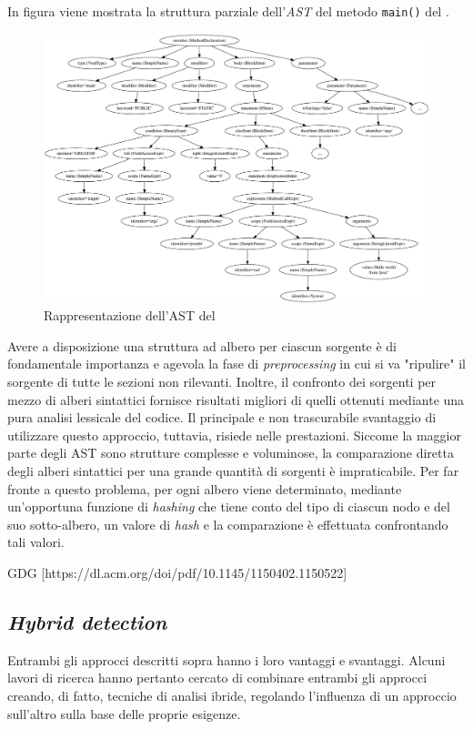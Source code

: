 In figura  viene mostrata la struttura parziale dell'\textit{AST} del metodo \texttt{main()} del .

\begin{figure}
    \centering
    \includegraphics[width=1.1\textwidth]{resources/img/01-ast-summarized.pdf}
    \caption{Rappresentazione dell'AST del }
    \label{img:01-ast}
\end{figure}

Avere a disposizione una struttura ad albero per ciascun sorgente è di fondamentale importanza e agevola la fase di \textit{preprocessing} in cui si va "ripulire" il sorgente di tutte le sezioni non rilevanti.
%
Inoltre, il confronto dei sorgenti per mezzo di alberi sintattici fornisce risultati migliori di quelli ottenuti mediante una pura analisi lessicale del codice.
%
Il principale e non trascurabile svantaggio di utilizzare questo approccio, tuttavia, risiede nelle prestazioni.
%
Siccome la maggior parte degli AST sono strutture complesse e voluminose, la comparazione diretta degli alberi sintattici per una grande quantità di sorgenti è impraticabile.
%
Per far fronte a questo problema, per ogni albero viene determinato, mediante un'opportuna funzione di \textit{hashing} che tiene conto del tipo di ciascun nodo e del suo sotto-albero, un valore di \textit{hash} e la comparazione è effettuata confrontando tali valori.

GDG
[https://dl.acm.org/doi/pdf/10.1145/1150402.1150522]

\subsection{\textit{Hybrid detection}}
Entrambi gli approcci descritti sopra hanno i loro vantaggi e svantaggi. 
%
Alcuni lavori di ricerca hanno pertanto cercato di combinare entrambi gli approcci creando, di fatto, tecniche di analisi ibride, regolando l'influenza di un approccio sull'altro sulla base delle proprie esigenze.

